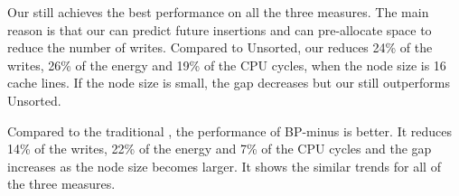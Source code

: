 Our \bptree still achieves the best performance on all the three
measures. The main reason is that our \bptree can predict future
insertions and can pre-allocate space to reduce the number of
writes. Compared to Unsorted, our \bptree reduces 24\% of the
writes, 26\% of the energy and 19\% of the CPU cycles, when the
node size is 16 cache lines. If the node size is small, the gap
decreases but our \bptree still outperforms Unsorted.

Compared to the traditional \bplustree, the performance of
BP-minus is better. It reduces 14\% of the writes, 22\% of the
energy and 7\% of the CPU cycles and the gap increases as the node
size becomes larger. It shows the similar trends for all of the three measures.

\begin{figure}[!t]
\centering


\end{figure}
